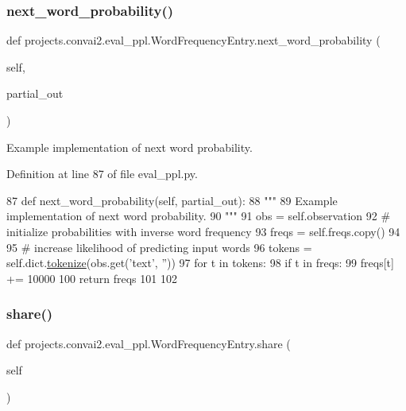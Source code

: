 \subsubsection{\texorpdfstring{next\+\_\+word\+\_\+probability()}{next\_word\_probability()}}
{\footnotesize\ttfamily def projects.\+convai2.\+eval\+\_\+ppl.\+Word\+Frequency\+Entry.\+next\+\_\+word\+\_\+probability (\begin{DoxyParamCaption}\item[{}]{self,  }\item[{}]{partial\+\_\+out }\end{DoxyParamCaption})}

\begin{DoxyVerb}Example implementation of next word probability.
\end{DoxyVerb}
 

Definition at line 87 of file eval\+\_\+ppl.\+py.


\begin{DoxyCode}
87     \textcolor{keyword}{def }next\_word\_probability(self, partial\_out):
88         \textcolor{stringliteral}{"""}
89 \textcolor{stringliteral}{        Example implementation of next word probability.}
90 \textcolor{stringliteral}{        """}
91         obs = self.observation
92         \textcolor{comment}{# initialize probabilities with inverse word frequency}
93         freqs = self.freqs.copy()
94 
95         \textcolor{comment}{# increase likelihood of predicting input words}
96         tokens = self.dict.\hyperlink{namespaceparlai_1_1agents_1_1tfidf__retriever_1_1build__tfidf_a1fdb457e98eb4e4c26047e229686a616}{tokenize}(obs.get(\textcolor{stringliteral}{'text'}, \textcolor{stringliteral}{''}))
97         \textcolor{keywordflow}{for} t \textcolor{keywordflow}{in} tokens:
98             \textcolor{keywordflow}{if} t \textcolor{keywordflow}{in} freqs:
99                 freqs[t] += 10000
100         \textcolor{keywordflow}{return} freqs
101 
102 
\end{DoxyCode}
\mbox{\label{classprojects_1_1convai2_1_1eval__ppl_1_1WordFrequencyEntry_a5abf8443347e45742e911d441a8b9c10}} 
\subsubsection{\texorpdfstring{share()}{share()}}
{\footnotesize\ttfamily def projects.\+convai2.\+eval\+\_\+ppl.\+Word\+Frequency\+Entry.\+share (\begin{DoxyParamCaption}\item[{}]{self }\end{DoxyParamCaption})}



